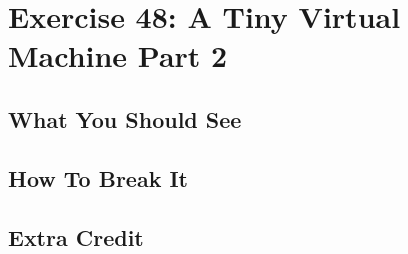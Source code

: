 \chapter{Exercise 48: A Tiny Virtual Machine Part 2}


\section{What You Should See}


\section{How To Break It}


\section{Extra Credit}



